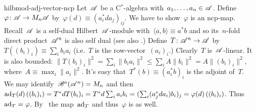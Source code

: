 \begin{solution}{hilbmod-adj-vector-ncp}%
   Let~$\mathscr{A}$ be a C$^*$-algebra
        with~$a_1, \ldots, a_n \in \mathscr{A}$.
    Define~$\varphi \colon \mathscr{A} \to M_n \mathscr{A}$
        by~$\varphi(d) \equiv (a_i^* d a_j)_{ij}$.
        We have to show~$\varphi$ is an ncp-map.
Recall~$\mathscr{A}$ is a self-dual Hilbert~$\mathscr{A}$-module
    with~$\langle a,b\rangle \equiv a^*b$
    and so its~$n$-fold direct product~$\mathscr{A}^n$
    is also self dual (see also .)
Define~$T\colon \mathscr{A}^n \to \mathscr{A}$
    by~$T((b_i)_i) \equiv \sum_i b_i a_i$
    (i.e.~$T$ is the row-vector~$(a_i)_i$.)
Clearly~$T$ is~$\mathscr{A}$-linear.
    It is also bounded: $\| T (b_i)_i \|^2 = \sum_i \|b_i a_i\|^2
        \leq \sum_i A \|b_i\|^2 = A \| (b_i)_i\|^2 $,
            where~$A \equiv \max_i \|a_i\|^2$.
    It's easy that~$T^*(b) \equiv (a_i^* b)_i$ is the adjoint of~$T$.
We may identify~$\mathscr{B}^a(\mathscr{A}^n) = M_n$
    and then~$\mathrm{ad}_T(d)\,  ((b_i)_i) = T^* d T (b_i)_i
                =  T^* d \sum_i a_i b_i
                = (\sum_i (a_j^* d a_i) b_i)_j 
                = \varphi(d) \, ((b_i)_i)$.
Thus~$\mathrm{ad}_T = \varphi$.
    By~ the map~$\mathrm{ad}_T$ and thus~$\varphi$ is as well.
\end{solution}
